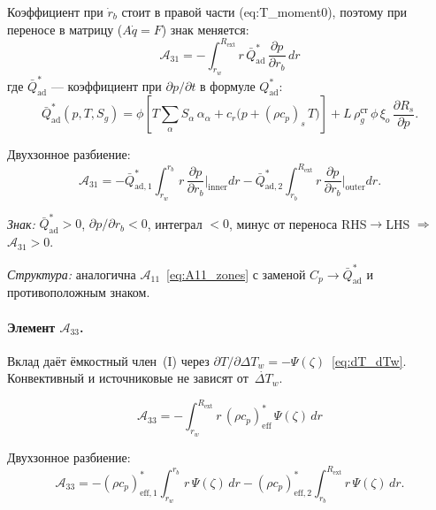 \documentclass[12pt,a4paper]{article}
\begin{document}
Коэффициент при $\dot{r}_b$ стоит в правой части (eq:T\_moment0),
поэтому при переносе в матрицу ($A\dot{q} = F$) знак меняется:
\begin{equation}\label{eq:A31}
  \boxed{
    \mathcal{A}_{31}
    = -\int_{r_w}^{R_{\text{ext}}} r\,\bar{Q}_{\text{ad}}^{*}\,
      \frac{\partial p}{\partial r_b}\,dr
  }
\end{equation}
где $\bar{Q}_{\text{ad}}^{*}$ --- коэффициент при $\partial p/\partial t$
в формуле $Q_{\text{ad}}^*$:
\begin{equation}\label{eq:Qad_star_coeff}
  \bar{Q}_{\text{ad}}^{*}(p,T,S_g)
  = \phi\!\left[T\sum_\alpha S_\alpha\,\alpha_\alpha
    + c_r\bigl(p + (\rho c_p)_s\,T\bigr)\right]
  + L\,\rho_g^{\text{ст}}\,\phi\,\xi_o\,\frac{\partial R_s}{\partial p}.
\end{equation}

Двухзонное разбиение:
\begin{equation}\label{eq:A31_zones}
  \mathcal{A}_{31}
  = -\bar{Q}_{\text{ad},1}^{*}
    \int_{r_w}^{r_b} r\,\frac{\partial p}{\partial r_b}\bigg|_{\text{inner}} dr
    - \bar{Q}_{\text{ad},2}^{*}
    \int_{r_b}^{R_{\text{ext}}} r\,\frac{\partial p}{\partial r_b}\bigg|_{\text{outer}} dr.
\end{equation}

\emph{Знак:} $\bar{Q}_{\text{ad}}^{*} > 0$,
$\partial p/\partial r_b < 0$, интеграл $< 0$,
минус от переноса RHS$\to$LHS
$\Rightarrow$ $\mathcal{A}_{31} > 0$.

\emph{Структура:} аналогична $\mathcal{A}_{11}$~\eqref{eq:A11_zones}
с заменой $C_p \to \bar{Q}_{\text{ad}}^{*}$ и противоположным знаком.

\paragraph{Элемент $\mathcal{A}_{33}$.}

Вклад даёт ёмкостный член~(I) через
$\partial T/\partial \Delta T_w = -\Psi(\zeta)$~\eqref{eq:dT_dTw}.
Конвективный и источниковые не зависят от~$\dot{\Delta T}_w$.

\begin{equation}\label{eq:A33}
  \boxed{
    \mathcal{A}_{33}
    = -\int_{r_w}^{R_{\text{ext}}} r\,(\rho c_p)_{\text{eff}}^{*}\,
      \Psi(\zeta)\,dr
  }
\end{equation}

Двухзонное разбиение:
\begin{equation}\label{eq:A33_zones}
  \mathcal{A}_{33}
  = -(\rho c_p)_{\text{eff},1}^{*}
    \int_{r_w}^{r_b} r\,\Psi(\zeta)\,dr
    - (\rho c_p)_{\text{eff},2}^{*}
    \int_{r_b}^{R_{\text{ext}}} r\,\Psi(\zeta)\,dr.
\end{equation}
\end{document}

